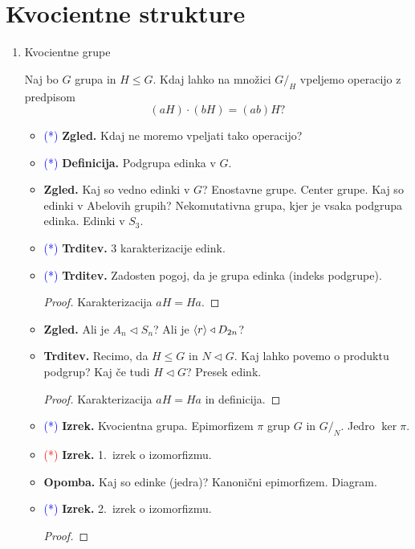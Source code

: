 \section{Kvocientne strukture}

\begin{enumerate}
    \item Kvocientne grupe
    
    Naj bo \(G\) grupa in \(H \leq G\). Kdaj lahko na množici \(G/_H\) vpeljemo operacijo z predpisom 
    \[(aH) \cdot (bH) = (ab)H?\]
    \begin{itemize}
        \item \textcolor{blue}{(*)} \textbf{Zgled.} Kdaj ne moremo vpeljati tako operacijo?
        \item \textcolor{blue}{(*)} \textbf{Definicija.} Podgrupa edinka v \(G\).
        \item \textbf{Zgled.} Kaj so vedno edinki v \(G\)? Enostavne grupe. Center grupe. Kaj so edinki v Abelovih grupih? Nekomutativna grupa, kjer je vsaka podgrupa edinka. Edinki v \(S_3\).
        \item \textcolor{blue}{(*)} \textbf{Trditev.} 3 karakterizacije edink. 
        \item \textcolor{blue}{(*)} \textbf{Trditev.} Zadosten pogoj, da je grupa edinka (indeks podgrupe).
        \begin{proof}
            Karakterizacija \(aH = Ha\).
        \end{proof}
        \item \textbf{Zgled.} Ali je \(A_n \triangleleft S_n\)? Ali je \(\langle {r} \rangle \triangleleft D_{2n}\)?
        \item \textbf{Trditev.} Recimo, da \(H \leq G\) in \(N \triangleleft G\). Kaj lahko povemo o produktu podgrup? Kaj če tudi \(H \triangleleft G\)? Presek edink.
        \begin{proof}
            Karakterizacija \(aH = Ha\) in definicija.
        \end{proof}
        \item \textcolor{blue}{(*)} \textbf{Izrek.} Kvocientna grupa. Epimorfizem \(\pi\) grup \(G\) in \(G/_N\). Jedro \(\ker \pi\).
        \item \textcolor{red}{(*)} \textbf{Izrek.} 1.\ izrek o izomorfizmu.
        \item \textbf{Opomba.} Kaj so edinke (jedra)? Kanonični epimorfizem. Diagram.
        \item \textcolor{blue}{(*)} \textbf{Izrek.} 2.\ izrek o izomorfizmu.
        \begin{proof}

\end{proof}
\end{itemize}
\end{enumerate}
